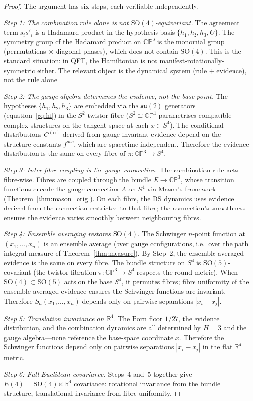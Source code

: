 \documentclass[11pt,a4paper]{article}
\theoremstyle{definition}
\theoremstyle{remark}
\newcommand{\CP}{\mathbb{CP}}
\newcommand{\R}{\mathbb{R}}
\newcommand{\su}{\mathfrak{su}}
\begin{document}
\begin{proof}
The argument has six steps, each verifiable independently.

\emph{Step 1: The combination rule alone is not $\mathrm{SO}(4)$-equivariant.} The agreement term $s_is'_i$ is a Hadamard product in the hypothesis basis $\{h_1,h_2,h_3,\Theta\}$. The symmetry group of the Hadamard product on $\CP^3$ is the monomial group (permutations $\times$ diagonal phases), which does not contain $\mathrm{SO}(4)$. This is the standard situation: in QFT, the Hamiltonian is not manifest-rotationally-symmetric either. The relevant object is the dynamical system (rule $+$ evidence), not the rule alone.

\emph{Step 2: The gauge algebra determines the evidence, not the base point.} The hypotheses $\{h_1,h_2,h_3\}$ are embedded via the $\su(2)$ generators (equation~\ref{eq:hi}) in the $S^2$ twistor fibre ($S^2\cong\CP^1$ parametrises compatible complex structures on the tangent space at each $x\in S^4$). The conditional distributions $C^{(\alpha)}$ derived from gauge-invariant evidence depend on the structure constants $f^{abc}$, which are spacetime-independent. Therefore the evidence distribution is the same on every fibre of $\pi:\CP^3\to S^4$.

\emph{Step 3: Inter-fibre coupling is the gauge connection.} The combination rule acts fibre-wise. Fibres are coupled through the bundle $E\to\CP^3$, whose transition functions encode the gauge connection $A$ on $S^4$ via Mason's framework (Theorem~\ref{thm:mason_orig}). On each fibre, the DS dynamics uses evidence derived from the connection restricted to that fibre; the connection's smoothness ensures the evidence varies smoothly between neighbouring fibres.

\emph{Step 4: Ensemble averaging restores $\mathrm{SO}(4)$.} The Schwinger $n$-point function at $(x_1,\ldots,x_n)$ is an ensemble average (over gauge configurations, i.e.\ over the path integral measure of Theorem~\ref{thm:measure}). By Step~2, the ensemble-averaged evidence is the same on every fibre. The bundle structure on $S^4$ is $\mathrm{SO}(5)$-covariant (the twistor fibration $\pi:\CP^3\to S^4$ respects the round metric). When $\mathrm{SO}(4)\subset\mathrm{SO}(5)$ acts on the base $S^4$, it permutes fibres; fibre uniformity of the ensemble-averaged evidence ensures the Schwinger functions are invariant. Therefore $S_n(x_1,\ldots,x_n)$ depends only on pairwise separations $|x_i-x_j|$.

\emph{Step 5: Translation invariance on $\R^4$.} The Born floor $1/27$, the evidence distribution, and the combination dynamics are all determined by $H=3$ and the gauge algebra---none reference the base-space coordinate $x$. Therefore the Schwinger functions depend only on pairwise separations $|x_i-x_j|$ in the flat $\R^4$ metric.

\emph{Step 6: Full Euclidean covariance.} Steps~4 and~5 together give $E(4)=\mathrm{SO}(4)\ltimes\R^4$ covariance: rotational invariance from the bundle structure, translational invariance from fibre uniformity.
\end{proof}
\end{document}
